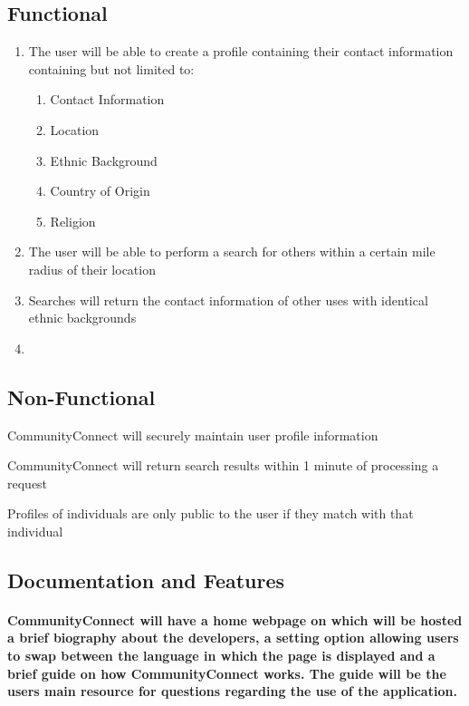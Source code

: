 \documentclass[12pt]{article}
\begin{document}
		\subsection{\bf Functional}
			\begin{enumerate}
				\item The user will be able to create a profile containing their contact information containing but not limited to:
					\begin{enumerate}
						\item Contact Information
						\item Location
						\item Ethnic Background
						\item Country of Origin
						\item Religion
					\end{enumerate}
				\item The user will be able to perform a search for others within a certain mile radius of their location
				\item	Searches will return the contact information of other uses with identical ethnic backgrounds
				\item
			\end{enumerate}
		\subsection{\bf Non-Functional}
			\item CommunityConnect will securely maintain user profile information
			\item CommunityConnect will return search results within 1 minute of processing a request
			\item Profiles of individuals are only public to the user if they match with that individual
	\subsection{\bf Documentation and Features}
		\paragraph{\normalfont \indent CommunityConnect will have a home webpage on which will be hosted a brief biography about the developers, a setting option allowing users to swap between the language in which the page is displayed and a brief guide on how CommunityConnect works. The guide will be the users main resource for questions regarding the use of the application.
		}
\end{document}
